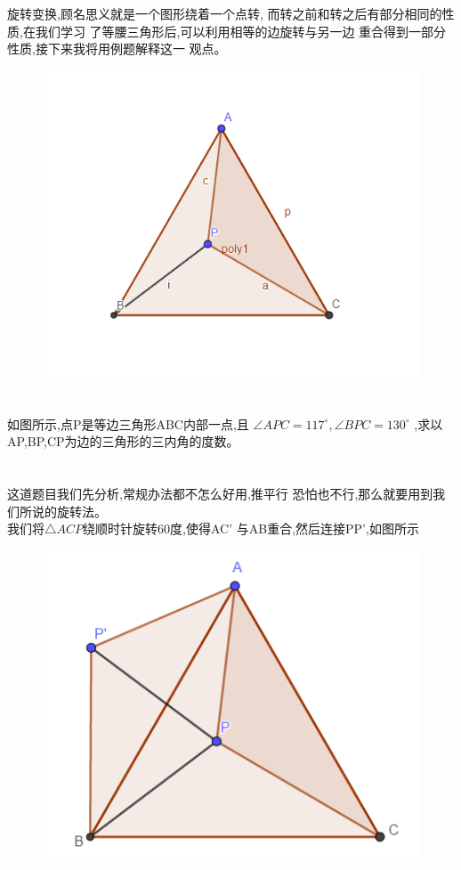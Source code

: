 \documentclass[11pt,twoside,UTF8]{ctexart}
\begin{document}
旋转变换,顾名思义就是一个图形绕着一个点转,
而转之前和转之后有部分相同的性质,在我们学习
了等腰三角形后,可以利用相等的边旋转与另一边
重合得到一部分性质,接下来我将用例题解释这一
观点。\\
\begin{figure}[ht]
    \centering
    \includegraphics[scale=0.6]{Before1.jpg}
\end{figure}\\
如图所示,点P是等边三角形ABC内部一点,且
$\angle APC=117^\circ,\angle BPC=130^\circ$
,求以AP,BP,CP为边的三角形的三内角的度数。
\\\\\\
这道题目我们先分析,常规办法都不怎么好用,推平行
恐怕也不行,那么就要用到我们所说的旋转法。\\
我们将$\triangle ACP$绕顺时针旋转60度,使得AC'
与AB重合,然后连接PP',如图所示\\
\begin{figure}[ht]
    \centering
    \includegraphics[scale=0.5]{After1.jpg}
\end{figure}\\
\end{document}
